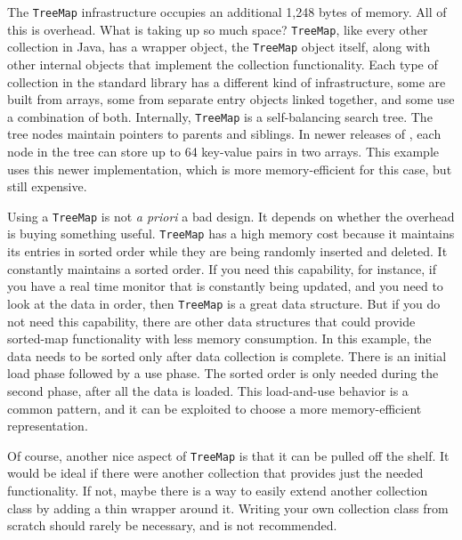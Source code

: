 The \texttt{TreeMap} infrastructure occupies an additional 1,248 bytes of
memory. All of this is overhead. What is taking up so much space? 
\texttt{TreeMap}, like every other collection in Java, has a wrapper object, the
\texttt{TreeMap} object itself, along with other internal objects that implement
the collection functionality. Each type of collection in the standard library
has a different kind of infrastructure, some are built from arrays, some from separate entry objects linked together, and some use a combination of both. Internally, \texttt{TreeMap} is a self-balancing search tree. The tree nodes maintain pointers to parents and siblings.  In newer releases of \javasix, each node in the tree can store up to 64 key-value pairs in two arrays. This example uses this newer implementation, which is more memory-efficient for this case, but still expensive.

Using a \texttt{TreeMap} is not \textit{a priori} a bad design. It depends on whether the overhead is buying something useful. \texttt{TreeMap} has a high memory cost because it maintains its entries in sorted order while they are being randomly inserted and deleted. It constantly maintains a sorted order. If you need this capability, for instance, if you have a real time monitor that is constantly being updated, and you need to look at the data in order, then \texttt{TreeMap} is a great data structure.  But if you do not need this capability, there are other data structures that could provide sorted-map functionality with less memory consumption. In this example, the data needs to be sorted only after data collection is complete. There is an initial load phase followed by a use phase. The sorted order is only needed during the second phase, after all the data is loaded. This load-and-use behavior is a common pattern, and it can be exploited to choose a more memory-efficient representation.

Of course, another nice aspect of \texttt{TreeMap} is that it can be pulled off the shelf. It would be ideal if there were another collection that provides just the needed functionality. If not, maybe there is a way to easily extend another collection class by adding a thin wrapper around it. Writing your own collection class from scratch should rarely be necessary, and is not recommended.

